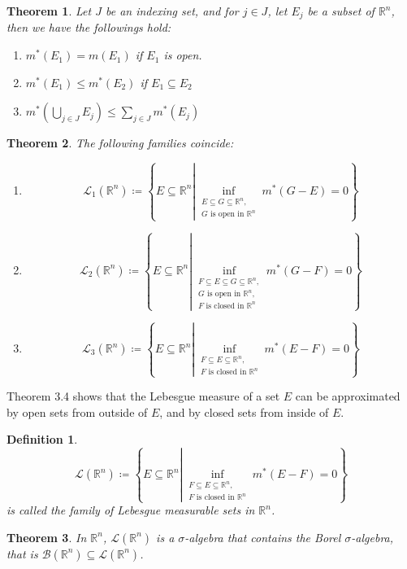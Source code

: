 \documentclass[11pt]{book}
\theoremstyle{break}
\theoremstyle{break}
\newtheorem{thm}{Theorem}[section]
\newtheorem{defn}{Definition}[corL]
\newcommand{\R}{\mathbb{R}}
\begin{document}
\begin{thm}
Let $J$ be an indexing set, and for $j \in J$, let $E_j$ be a subset of $\R^n$, then we have the followings hold:
\begin{enumerate}[topsep=3pt,itemsep=-1ex,partopsep=1ex,parsep=1ex]
\item $m^*(E_1) = m(E_1)$ if $E_1$ is open. 
\item $m^*(E_1) \leq m^*(E_2)$ if $E_1 \subseteq E_2$
\item $m^*(\bigcup_{j \in J}E_j) \leq \sum_{j \in J}m^*(E_j)$
\end{enumerate}
\end{thm}

\newpage
\begin{thm}
The following families coincide:
\begin{enumerate}[topsep=3pt,itemsep=-1ex,partopsep=1ex,parsep=1ex]
\item $$\mathcal{L}_1(\R^n) \coloneqq \left\{ E \subseteq \R^n \left| \inf_{\substack{E \subseteq G \subseteq \R^n,\\ G\text{ is open in }\R^n}}m^*(G-E) = 0\right.\right\}$$
\item $$\mathcal{L}_2(\R^n) \coloneqq \left\{ E \subseteq \R^n \left| \inf_{\substack{F \subseteq E \subseteq G\subseteq \R^n,\\ G\text{ is open in }\R^n,\\
F \text{ is closed in }\R^n}}m^*(G-F) = 0\right.\right\}$$
\item $$\mathcal{L}_3(\R^n) \coloneqq \left\{ E \subseteq \R^n \left| \inf_{\substack{F \subseteq E \subseteq \R^n,\\ 
F \text{ is closed in }\R^n}}m^*(E-F) = 0\right.\right\}$$
\end{enumerate}
\end{thm}

Theorem 3.4 shows that the Lebesgue measure of a set $E$ can be approximated by open sets from outside of $E$, and by closed sets from inside of $E$. \\

\begin{defn}
$$\mathcal{L}(\R^n) \coloneqq \left\{ E \subseteq \R^n \left| \inf_{\substack{F \subseteq E \subseteq \R^n,\\ 
F \text{ is closed in }\R^n}}m^*(E-F) = 0\right.\right\}$$
is called the family of Lebesgue measurable sets in $\R^n$. 
\end{defn}

\begin{thm}
In $\R^n$, $\mathcal{L}(\R^n)$ is a $\sigma$-algebra that contains the Borel $\sigma$-algebra, that is $\mathcal{B}(\R^n) \subseteq \mathcal{L}(\R^n)$. 
\end{thm}
\end{document}
